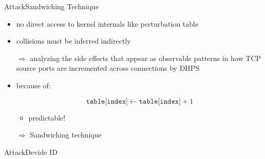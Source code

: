\documentclass[aspectratio=169, hyperref={colorlinks=true, allcolors=SecondaryColor}, c]{beamer}
\begin{document}
\begin{frame}[fragile]{Attack}{Sandwiching Technique}
	\begin{itemize}
		\item no direct access to kernel internals like \alert{perturbation table}%
		\item collisions must be inferred indirectly
		\item[\alert{$\Rightarrow$}] analyzing the side effects that appear as observable patterns in how TCP source ports are incremented across connections by DHPS
	\end{itemize}
	\begin{itemize}
		\item {} because of:
		\vspace{-0.4cm}
		\begin{adjustbox}{max width=0.8\textwidth}
			\begin{minipage}{\textwidth}
				\[
					\texttt{table[index]} \leftarrow \texttt{table[index]} + 1
				\]
			\end{minipage}
		\end{adjustbox}
		\vspace{0.8cm}
		\begin{itemize}
			\item \alert{predictable!}
		\end{itemize}
		\item[\alert{$\Rightarrow$}] \alert{Sandwiching technique}
	\end{itemize}
\end{frame}

\begin{frame}[fragile]{Attack}{Devide ID}
	\begin{columns}
		\begin{column}{0.5\textwidth}

		\end{column}
		\begin{column}{0.5\textwidth}

		\end{column}
	\end{columns}
\end{frame}
\end{document}
